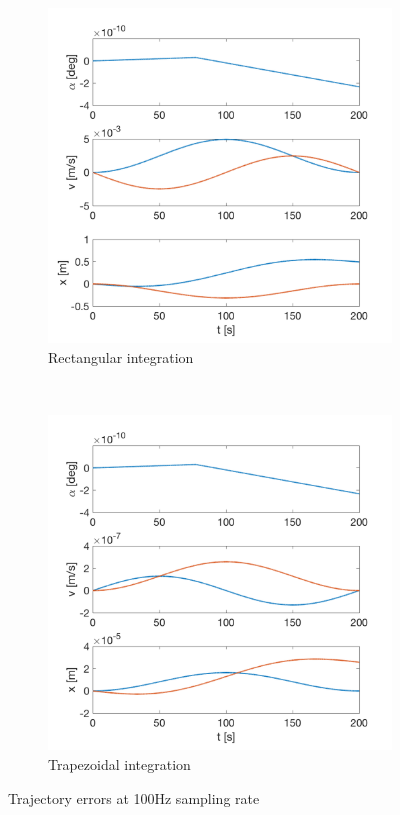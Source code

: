 \documentclass{article}
\begin{document}
\begin{figure}[H]
    \centering
    \begin{subfigure}[t]{0.49\textwidth}
        \centering
        \includegraphics[width=\textwidth]{rectangular_int_100hz}
        \caption{Rectangular integration}
    \end{subfigure}
    ~
    \begin{subfigure}[t]{0.49\textwidth}
        \centering
        \includegraphics[width=\textwidth]{trapezoidal_int_100hz}
        \caption{Trapezoidal integration}
    \end{subfigure}
    \caption{Trajectory errors at 100Hz sampling rate}
    \label{fig:error_100hz}
\end{figure}
\end{document}
